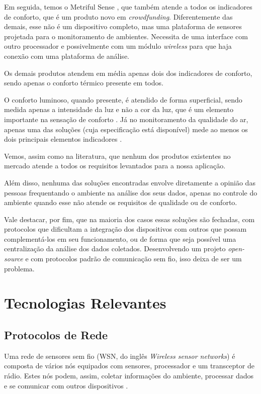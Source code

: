 \documentclass[../monografia.tex]{subfiles}
\begin{document}
Em seguida, temos o Metriful Sense \cite{metriful}, que também atende a todos os indicadores de conforto, que é um produto novo em \textit{crowdfunding}. Diferentemente das demais, esse não é um dispositivo completo, mas uma plataforma de sensores projetada para o monitoramento de ambientes. Necessita de uma interface com outro processador e possivelmente com um módulo \textit{wireless} para que haja conexão com uma plataforma de análise. 

Os demais produtos atendem em média apenas dois dos indicadores de conforto, sendo apenas o conforto térmico presente em todos. 

O conforto luminoso, quando presente, é atendido de forma superficial, sendo medida apenas a intensidade da luz e não a cor da luz, que é um elemento importante na sensação de conforto \cite{VisualComfort}. Já no monitoramento da qualidade do ar, apenas uma das soluções \cite{ECOMLITE} (cuja especificação está disponível) mede ao menos os dois principais elementos indicadores \cite{AirQuality}. 

Vemos, assim como na literatura, que nenhum dos produtos existentes no mercado atende a todos os requisitos levantados para a nossa aplicação. 

Além disso, nenhuma das soluções encontradas envolve diretamente a opinião das pessoas frequentando o ambiente na análise dos seus dados, apenas no controle do ambiente quando esse não atende os requisitos de qualidade ou de conforto. 

Vale destacar, por fim, que na maioria dos casos essas soluções são fechadas, com protocolos que dificultam a integração dos dispositivos com outros que possam complementá-los em seu funcionamento, ou de forma que seja possível uma centralização da análise dos dados coletados. Desenvolvendo um projeto \textit{open-source} e com protocolos padrão de comunicação sem fio, isso deixa de ser um problema. 

\section{Tecnologias Relevantes} 

\subsection{Protocolos de Rede} \label{arte:protocolos}

Uma rede de sensores sem fio (WSN, do inglês \textit{Wireless sensor networks}) é composta de vários nós equipados com sensores, processador e um transceptor de rádio. Estes nós podem, assim, coletar informações do ambiente, processar dados e se comunicar com outros dispositivos \cite{wsn-networking}.
\end{document}
